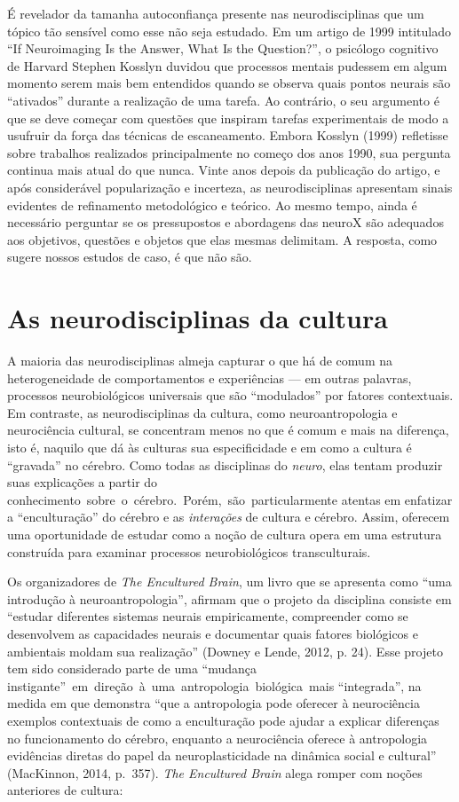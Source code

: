 É revelador da tamanha autoconfiança presente nas neurodisciplinas
que um tópico tão sensível como esse não seja estudado. Em um
artigo de 1999 intitulado ``If Neuroimaging Is the Answer, What Is the
Question?'', o psicólogo cognitivo de Harvard Stephen Kosslyn duvidou
que processos mentais pudessem em algum momento serem mais bem entendidos
quando se observa quais pontos neurais são ``ativados'' durante a
realização de uma tarefa. Ao contrário, o seu argumento é que se deve
começar com questões que inspiram tarefas experimentais de modo a
usufruir da força das técnicas de escaneamento. Embora Kosslyn (1999)
refletisse sobre trabalhos realizados principalmente no começo
dos anos 1990, sua pergunta continua mais atual do que nunca.
Vinte anos depois da publicação do artigo, e após considerável
popularização e incerteza, as neurodisciplinas apresentam sinais
evidentes de refinamento metodológico e teórico. Ao mesmo tempo, ainda é
necessário perguntar se os pressupostos e abordagens das neuroX são
adequados aos objetivos, questões e objetos que elas mesmas delimitam. A
resposta, como sugere nossos estudos de caso, é que não são.

\section{As neurodisciplinas da cultura}

A maioria das neurodisciplinas almeja capturar o que há de comum na
heterogeneidade de comportamentos e experiências --- em outras palavras,
processos neurobiológicos universais que são ``modulados'' por fatores
contextuais. Em contraste, as neurodisciplinas da cultura, como
neuroantropologia e neurociência cultural, se concentram menos no que é
comum e mais na diferença, isto é, naquilo que dá às culturas sua
especificidade e em como a cultura é ``gravada'' no cérebro. Como todas
as disciplinas do \emph{neuro}, elas tentam produzir suas explicações a
partir do conhecimento~sobre~o~cérebro.~Porém,~são~particularmente
atentas em enfatizar a ``enculturação'' do cérebro e as
\emph{interações} de cultura e cérebro. Assim, oferecem uma oportunidade
de estudar como a noção de cultura opera em uma estrutura construída
para examinar processos neurobiológicos transculturais.

Os organizadores de \emph{The Encultured Brain}, um livro que se apresenta
como ``uma introdução à neuroantropologia'', afirmam que o projeto da
disciplina consiste em ``estudar diferentes sistemas neurais
empiricamente, compreender como se desenvolvem as capacidades neurais e
documentar quais fatores biológicos e ambientais moldam sua realização''
(Downey e Lende, 2012, p. 24). Esse projeto tem sido considerado parte
de uma ``mudança instigante''~em~direção~à~uma~antropologia~biológica~mais ``integrada'', na medida em que demonstra ``que a antropologia pode
oferecer à neurociência exemplos contextuais de como a enculturação pode
ajudar a explicar diferenças no funcionamento do cérebro, enquanto a
neurociência oferece à antropologia evidências diretas do papel da
neuroplasticidade na dinâmica social e cultural'' (MacKinnon, 2014,
p.~357). \emph{The Encultured Brain} alega romper com noções anteriores
de cultura:

